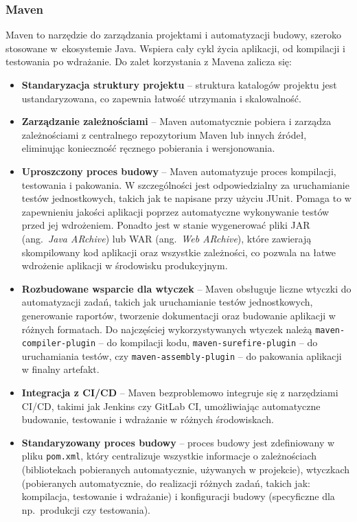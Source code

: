 \subsubsection{Maven}
Maven to narzędzie do zarządzania projektami i automatyzacji budowy, szeroko stosowane w~ekosystemie Java. Wspiera cały cykl życia aplikacji, od kompilacji i testowania po wdrażanie. Do zalet korzystania z Mavena zalicza się:
\begin{itemize}
    \item \textbf{Standaryzacja struktury projektu} -- struktura katalogów projektu jest ustandaryzowana, co zapewnia łatwość utrzymania i skalowalność.
    \item \textbf{Zarządzanie zależnościami} -- Maven automatycznie pobiera i zarządza zależnościami z centralnego repozytorium Maven lub innych źródeł, eliminując konieczność ręcznego pobierania i wersjonowania. 
    \item \textbf{Uproszczony proces budowy} -- Maven automatyzuje proces kompilacji, testowania i pakowania. W szczególności jest odpowiedzialny za uruchamianie testów jednostkowych, takich jak te napisane przy użyciu JUnit. Pomaga to w zapewnieniu jakości aplikacji poprzez automatyczne wykonywanie testów przed jej wdrożeniem. Ponadto jest w stanie wygenerować pliki JAR (ang.~\emph{Java ARchive}) lub WAR (ang.~\emph{Web ARchive}), które zawierają skompilowany kod aplikacji oraz wszystkie zależności, co pozwala na łatwe wdrożenie aplikacji w środowisku produkcyjnym.
    \item \textbf{Rozbudowane wsparcie dla wtyczek} -- Maven obsługuje liczne wtyczki do automatyzacji zadań, takich jak uruchamianie testów jednostkowych, generowanie raportów, tworzenie dokumentacji oraz budowanie aplikacji w różnych formatach. Do najczęściej wykorzystywanych wtyczek należą \texttt{maven-compiler-plugin} -- do kompilacji kodu, \texttt{maven-surefire-plugin} -- do uruchamiania testów, czy \texttt{maven-assembly-plugin} -- do pakowania aplikacji w finalny artefakt.
    \item \textbf{Integracja z CI/CD} -- Maven bezproblemowo integruje się z narzędziami CI/CD, takimi jak Jenkins czy GitLab CI, umożliwiając automatyczne budowanie, testowanie i wdrażanie w różnych środowiskach.
    \item \textbf{Standaryzowany proces budowy} -- proces budowy jest zdefiniowany w pliku \texttt{pom.xml}, który centralizuje wszystkie informacje o zależnościach (bibliotekach pobieranych automatycznie, używanych w projekcie), wtyczkach (pobieranych automatycznie, do realizacji różnych zadań, takich jak: kompilacja, testowanie i wdrażanie) i konfiguracji budowy (specyficzne dla np.\ produkcji czy testowania).
\end{itemize}



